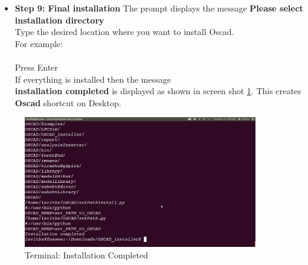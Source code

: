 \begin{itemize}
\item{\textbf{Step 9: Final installation}}
The prompt displays the message
\textbf{Please select installation directory}\\
Type the desired location where you want to install Oscad.\\
\newline
For example:\\
\\
Press Enter\\
\newline
If everything is installed then the message\\
\textbf{installation completed} is displayed as shown in screen shot \ref{installi}. This creates \textbf{Oscad} shortcut on Desktop.
\end{itemize}
\begin{figure}[h]
\centering
\includegraphics[width=0.9\textwidth]{figures/install9.png}
\caption{Terminal: Installation Completed}
\label{installi}
\end{figure}

